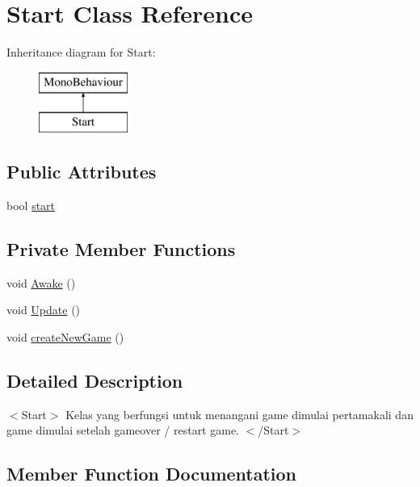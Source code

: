 \hypertarget{class_start}{}\section{Start Class Reference}
\label{class_start}
Inheritance diagram for Start\+:\begin{figure}[H]
\begin{center}
\leavevmode
\includegraphics[height=2.000000cm]{class_start}
\end{center}
\end{figure}
\subsection*{Public Attributes}
\begin{DoxyCompactItemize}
\item 
bool \hyperlink{class_start_a3e014e9f3fcc60afaf93ce46b4f23377}{start}
\end{DoxyCompactItemize}
\subsection*{Private Member Functions}
\begin{DoxyCompactItemize}
\item 
void \hyperlink{class_start_ab231df0dc7e25b0bed5c00fd004b99d1}{Awake} ()
\item 
void \hyperlink{class_start_a7911d6483c913d209dda8b107285a721}{Update} ()
\item 
void \hyperlink{class_start_aa9c0928bb57e1ce99c81cc9ad0ab3355}{create\+New\+Game} ()
\end{DoxyCompactItemize}


\subsection{Detailed Description}
$<$\+Start$>$ Kelas yang berfungsi untuk menangani game dimulai pertamakali dan game dimulai setelah gameover / restart game. $<$/\+Start$>$ 

\subsection{Member Function Documentation}
\hypertarget{class_start_ab231df0dc7e25b0bed5c00fd004b99d1}{}\label{class_start_ab231df0dc7e25b0bed5c00fd004b99d1} 
